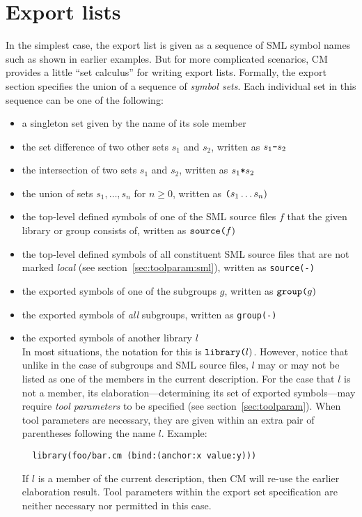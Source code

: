 %

\section{Export lists}
\label{sec:exportcalculus}

In the simplest case, the export list is given as a sequence of SML
symbol names such as shown in earlier examples.  But for more
complicated scenarios, CM provides a little ``set calculus'' for
writing export lists.  Formally, the export section specifies the
union of a sequence of {\em symbol sets}.  Each individual set in this
sequence can be one of the following:

\begin{itemize}\setlength{\itemsep}{0pt}
\item a singleton set given by the name of its sole member
\item the set difference of two other sets $s_1$ and $s_2$, written as $s_1
\mbox{\tt -} s_2$
\item the intersection of two sets $s_1$ and $s_2$, written as $s_1
\mbox{\tt *} s_2$
\item the union of sets $s_1, \ldots, s_n$ for $n \ge 0$, written as
$\mbox{\tt (} s_1 \ldots s_n \mbox{)}$
\item the top-level defined symbols of one of the SML source files $f$
that the given library or group consists of, written as
$\mbox{\tt source(}f\mbox{)}$
\item the top-level defined symbols of all constituent SML source
files that are not marked {\em local} (see section~\ref{sec:toolparam:sml}),
written as {\tt source(-)}
\item the exported symbols of one of the subgroups $g$, written as
$\mbox{\tt group(}g\mbox{)}$
\item the exported symbols of {\em all} subgroups, written as
{\tt group(-)}
\item the exported symbols of another library $l$ \\
In most situations, the notation for this is $\mbox{\tt library(}l\mbox{)}$.
However, notice that unlike in the case of subgroups and SML source
files, $l$ may or may not be listed as one of the members in the
current description.  For the case that $l$ is not a member, its
elaboration---determining its set of exported symbols---may require
{\em tool parameters} to be specified (see
section~\ref{sec:toolparam}).  When tool parameters are necessary,
they are given within an extra pair of parentheses following the name
$l$.  Example:
\begin{verbatim}
  library(foo/bar.cm (bind:(anchor:x value:y)))
\end{verbatim}
\noindent If $l$ is a member of the current description, then CM will
re-use the earlier elaboration result.  Tool parameters within the
export set specification are neither necessary nor permitted in this case.
\end{itemize}



